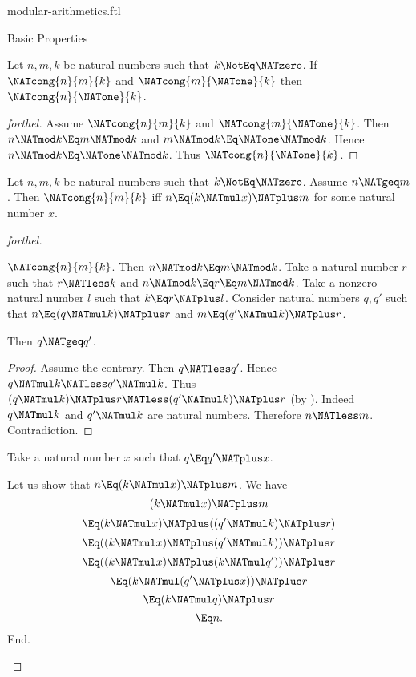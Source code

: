 \documentclass{stex}
\begin{document}
\begin{smodule}{modular-arithmetics.ftl}
\begin{sfragment}{Basic Properties}
  \begin{proposition}[forthel]
    Let $n, m, k$ be natural numbers such that $k \NotEq \NATzero$.
    If $\NATcong{n}{m}{k}$ and $\NATcong{m}{\NATone}{k}$ then $\NATcong{n}{\NATone}{k}$.
  \end{proposition}
  \begin{proof}[forthel]
    Assume $\NATcong{n}{m}{k}$ and $\NATcong{m}{\NATone}{k}$.
    Then $n \NATmod k \Eq m \NATmod k$ and $m \NATmod k \Eq \NATone \NATmod k$.
    Hence $n \NATmod k \Eq \NATone \NATmod k$.
    Thus $\NATcong{n}{\NATone}{k}$.
  \end{proof}

  \begin{proposition}[forthel]
    Let $n, m, k$ be natural numbers such that $k \NotEq \NATzero$.
    Assume $n \NATgeq m$.
    Then $\NATcong{n}{m}{k}$ iff $n \Eq (k \NATmul x) \NATplus m$ for some natural number $x$.
  \end{proposition}
  \begin{proof}[forthel]
    \begin{case}{$\NATcong{n}{m}{k}$.}
      Then $n \NATmod k \Eq m \NATmod k$.
      Take a natural number $r$ such that $r \NATless k$ and $n \NATmod k \Eq r \Eq m \NATmod k$.
      Take a nonzero natural number $l$ such that $k \Eq r \NATplus l$.
      Consider natural numbers $q,q'$ such that $n \Eq (q \NATmul k) \NATplus r$ and $m \Eq (q' \NATmul k) \NATplus r$.

      Then $q \NATgeq q'$.
      \begin{proof}
        Assume the contrary.
        Then $q \NATless q'$.
        Hence $q \NATmul k \NATless q' \NATmul k$.
        Thus $(q \NATmul k) \NATplus r \NATless (q' \NATmul k) \NATplus r$ (by ).
        Indeed $q \NATmul k$ and $q' \NATmul k$ are natural numbers.
        Therefore $n \NATless m$.
        Contradiction.
      \end{proof}

      Take a natural number $x$ such that $q \Eq q' \NATplus x$.

      Let us show that $n \Eq (k \NATmul x) \NATplus m$.
        We have
        \[  (k \NATmul x) \NATplus m                       \]
        \[    \Eq (k \NATmul x) \NATplus ((q' \NATmul k) \NATplus r)  \]
        \[    \Eq ((k \NATmul x) \NATplus (q' \NATmul k)) \NATplus r  \]
        \[    \Eq ((k \NATmul x) \NATplus (k \NATmul q')) \NATplus r  \]
        \[    \Eq (k \NATmul (q' \NATplus x)) \NATplus r            \]
        \[    \Eq (k \NATmul q) \NATplus r                   \]
        \[    \Eq n.                                \]
      End.
    \end{case}


\end{proof}
\end{sfragment}
\end{smodule}
\end{document}
